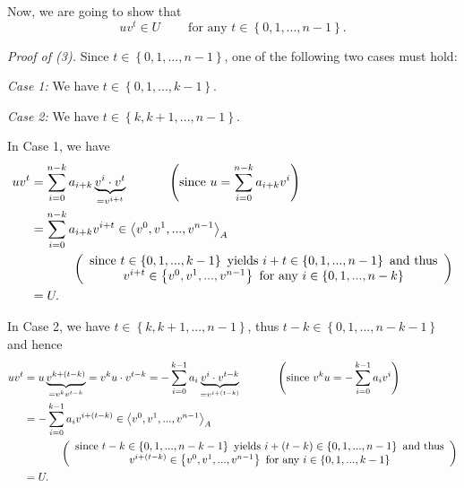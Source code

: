 \documentclass[12pt,final,notitlepage,onecolumn]{article}%
\begin{document}
Now, we are going to show that%
\begin{equation}
uv^{t}\in U\ \ \ \ \ \ \ \ \ \ \text{for any }t\in\left\{
0,1,...,n-1\right\}  . \label{3}%
\end{equation}


\textit{Proof of (3).} Since $t\in\left\{  0,1,...,n-1\right\}  $, one of the
following two cases must hold:

\textit{Case 1:} We have $t\in\left\{  0,1,...,k-1\right\}  $.

\textit{Case 2:} We have $t\in\left\{  k,k+1,...,n-1\right\}  $.

In Case 1, we have%
\begin{align*}
uv^{t}  &  =\sum\limits_{i=0}^{n-k}a_{i+k}\underbrace{v^{i}\cdot v^{t}%
}_{=v^{i+t}}\ \ \ \ \ \ \ \ \ \ \left(  \text{since }u=\sum\limits_{i=0}%
^{n-k}a_{i+k}v^{i}\right) \\
&  =\sum\limits_{i=0}^{n-k}a_{i+k}v^{i+t}\in\left\langle v^{0},v^{1}%
,...,v^{n-1}\right\rangle _{A}\\
&  \ \ \ \ \ \ \ \ \ \ \left(
\begin{array}
[c]{c}%
\text{since }t\in\left\{  0,1,...,k-1\right\}  \text{ yields }i+t\in\left\{
0,1,...,n-1\right\}  \text{ and thus}\\
v^{i+t}\in\left\{  v^{0},v^{1},...,v^{n-1}\right\}  \text{ for any }%
i\in\left\{  0,1,...,n-k\right\}
\end{array}
\right) \\
&  =U.
\end{align*}


In Case 2, we have $t\in\left\{  k,k+1,...,n-1\right\}  $, thus $t-k\in
\left\{  0,1,...,n-k-1\right\}  $ and hence%
\begin{align*}
uv^{t}  &  =u\underbrace{v^{k+\left(  t-k\right)  }}_{=v^{k}v^{t-k}}%
=v^{k}u\cdot v^{t-k}=-\sum\limits_{i=0}^{k-1}a_{i}\underbrace{v^{i}\cdot
v^{t-k}}_{=v^{i+\left(  t-k\right)  }}\ \ \ \ \ \ \ \ \ \ \left(  \text{since
}v^{k}u=-\sum\limits_{i=0}^{k-1}a_{i}v^{i}\right) \\
&  =-\sum\limits_{i=0}^{k-1}a_{i}v^{i+\left(  t-k\right)  }\in\left\langle
v^{0},v^{1},...,v^{n-1}\right\rangle _{A}\\
&  \ \ \ \ \ \ \ \ \ \ \left(
\begin{array}
[c]{c}%
\text{since }t-k\in\left\{  0,1,...,n-k-1\right\}  \text{ yields }i+\left(
t-k\right)  \in\left\{  0,1,...,n-1\right\}  \text{ and thus}\\
v^{i+\left(  t-k\right)  }\in\left\{  v^{0},v^{1},...,v^{n-1}\right\}  \text{
for any }i\in\left\{  0,1,...,k-1\right\}
\end{array}
\right) \\
&  =U.
\end{align*}
\end{document}
